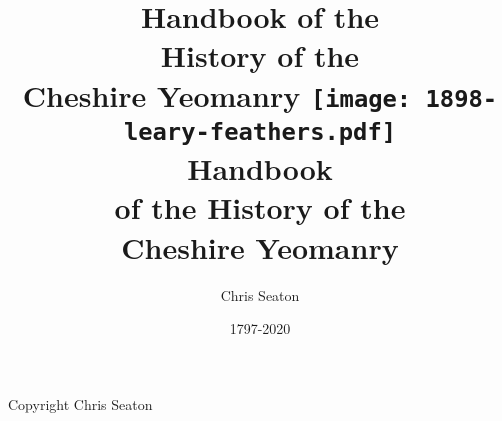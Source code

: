 \documentclass[a4paper,7pt]{book}
\title{Handbook of the \\ History of the \\ Cheshire Yeomanry}
\author{Chris Seaton}
\date{1797-2020}
\title{
  \texttt{[image: 1898-leary-feathers.pdf]} \\
  \vspace{10mm}
  \huge Handbook \\
  \vspace{2mm}
  \Large of the History of the \\
  \Huge Cheshire Yeomanry
}
\begin{document}
\frontmatter

\maketitle

\vspace*{\fill}

\begin{center}
  Copyright  Chris Seaton
\end{center}

\setcounter{tocdepth}{0}
\tableofcontents{}

\mainmatter




\end{document}

